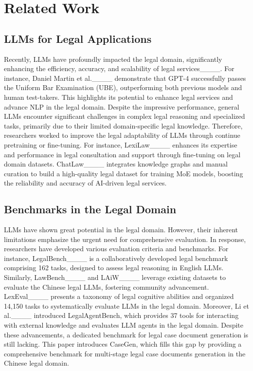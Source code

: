 \section{Related Work}
\subsection{LLMs for Legal Applications}
Recently, LLMs have profoundly impacted the legal domain, significantly enhancing the efficiency, accuracy, and scalability of legal services____. 
For instance, Daniel Martin et al.____ demonstrate that GPT-4 successfully passes the Uniform Bar Examination (UBE), outperforming both previous models and human test-takers. This highlights its potential to enhance legal services and advance NLP in the legal domain.
Despite the impressive performance, general LLMs encounter significant challenges in complex legal reasoning and specialized tasks, primarily due to their limited domain-specific legal knowledge. 
Therefore, researchers worked to improve the legal adaptability of LLMs  through continue pretraining or fine-tuning. For instance, LexiLaw____ enhances its expertise and performance in legal consultation and support through fine-tuning on legal domain datasets. ChatLaw____ integrates knowledge graphs and manual curation to build a high-quality legal dataset for training MoE models, boosting the reliability and accuracy of AI-driven legal services.


\subsection{Benchmarks in the Legal Domain}
LLMs have shown great potential in the legal domain. However, their inherent limitations emphasize the urgent need for comprehensive evaluation. In response, researchers have developed various evaluation criteria and benchmarks.
For instance, LegalBench____ is a collaboratively developed legal benchmark comprising 162 tasks, designed to assess legal reasoning in English LLMs.  Similarly, LawBench____ and LAiW____ leverage existing datasets to evaluate the Chinese legal LLMs, fostering community advancement.
LexEval____ presents a taxonomy of legal cognitive abilities and organized 14,150 tasks to systematically evaluate LLMs in the legal domain.
Moreover, Li et al.____ introduced LegalAgentBench, which provides 37 tools for interacting with external knowledge and evaluates LLM agents in the legal domain. 
Despite these advancements, a dedicated benchmark for legal case document generation is still lacking.
This paper introduces CaseGen, which fills this gap by providing a comprehensive benchmark for multi-stage legal case documents generation in the Chinese legal domain.